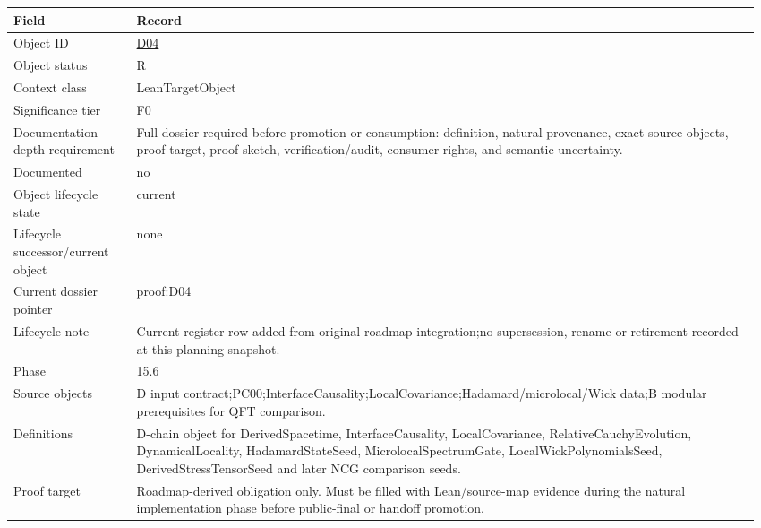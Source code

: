 \begin{longtable}{L{0.16\linewidth} L{0.81\linewidth}}
\hline
\textbf{Field} & \textbf{Record}\\
\hline
Object ID & \hyperlink{object-row-D04}{D04}\\
\hline\addlinespace[0.20em]
Object status & R\\
\hline\addlinespace[0.20em]
Context class & LeanTargetObject\\
\hline\addlinespace[0.20em]
Significance tier & F0\\
\hline\addlinespace[0.20em]
Documentation depth requirement & Full dossier required before promotion or consumption: definition, natural provenance, exact source objects, proof target, proof sketch, verification/\allowbreak{}audit, consumer rights, and semantic uncertainty.\\
\hline\addlinespace[0.20em]
Documented & no\\
\hline\addlinespace[0.20em]
Object lifecycle state & current\\
\hline\addlinespace[0.20em]
Lifecycle successor/\allowbreak{}current object & none\\
\hline\addlinespace[0.20em]
Current dossier pointer & proof:D04\\
\hline\addlinespace[0.20em]
Lifecycle note & Current register row added from original roadmap integration;\newline no supersession, rename or retirement recorded at this planning snapshot.\\
\hline\addlinespace[0.20em]
Phase & \hyperlink{phase-row-15-6}{15.6}\\
\hline\addlinespace[0.20em]
Source objects & D input contract;\newline PC00;\newline InterfaceCausality;\newline LocalCovariance;\newline Hadamard/\allowbreak{}microlocal/\allowbreak{}Wick data;\newline B modular prerequisites for QFT comparison.\\
\hline\addlinespace[0.20em]
Definitions & D-chain object for DerivedSpacetime, InterfaceCausality, LocalCovariance, RelativeCauchyEvolution, DynamicalLocality, HadamardStateSeed, MicrolocalSpectrumGate, LocalWickPolynomialsSeed, DerivedStressTensorSeed and later NCG comparison seeds.\\
\hline\addlinespace[0.20em]
Proof target & Roadmap-derived obligation only. Must be filled with Lean/\allowbreak{}source-map evidence during the natural implementation phase before public-final or handoff promotion.\\

\end{longtable}
